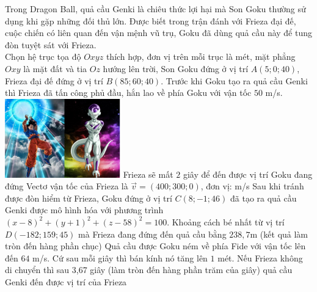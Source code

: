 \begin{ex}%
\immini
{
    Trong Dragon Ball, quả cầu Genki là chiêu thức lợi hại mà Son Goku thường sử dụng khi gặp những đối thủ lớn. Được biết trong trận đánh với Frieza đại đế, cuộc chiến có liên quan đến vận mệnh vũ trụ, Goku đã dùng quả cầu này để tung đòn tuyệt sát với Frieza.\\
Chọn hệ trục tọa độ $Oxyz$ thích hợp, đơn vị trên mỗi trục là mét, mặt phẳng $Oxy$ là mặt đất và tia $Oz$ hướng lên trời, Son Goku đứng ở vị trí $ A\left(5;0;40\right)$, Frieza đại đế đứng ở vị trí $ B\left(85;60;40\right)$. Trước khi Goku tạo ra quả cầu Genki thì Frieza đã tấn công phủ đầu, hắn lao về phía Goku với vận tốc $50$ m/s.
}
{
    \includegraphics[width=5cm]{img/HXN-1-16}
}
\choiceTF
    {\True Frieza sẽ mất $2$ giây để đến được vị trí Goku đang đứng}
    {Vectơ vận tốc của Frieza là $\vec{v}=\left(400;300;0\right)$, đơn vị: m/s}
    {\True Sau khi tránh được đòn hiểm từ Frieza, Goku đứng ở vị trí $ C\left(8;-1;46\right)$ đã tạo ra quả cầu Genki được mô hình hóa với phương trình $\left(x-8\right)^2+\left(y+1\right)^2+\left(z-58\right)^2=100$. Khoảng cách bé nhất từ vị trí $ D\left(-182;159;45\right)$ mà Frieza đang đứng đến quả cầu bằng $ 238{,}7$m (kết quả làm tròn đến hàng phần chục)}
    {\True Quả cầu được Goku ném về phía Fide với vận tốc lên đến $ 64$ m/s. Cứ sau mỗi giây thì bán kính nó tăng lên $1$ mét. Nếu Frieza không di chuyển thì sau 3,67 giây (làm tròn đến hàng phần trăm của giây) quả cầu Genki đến được vị trí của Frieza}
\end{ex}

